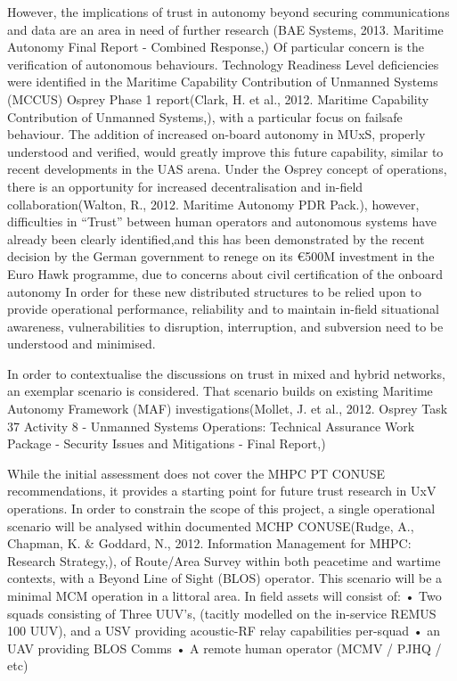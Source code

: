 However, the implications of trust in autonomy beyond securing communications and data are an area in need of further research (BAE Systems, 2013. Maritime Autonomy Final Report - Combined Response,)
Of particular concern is the verification of autonomous behaviours. Technology Readiness Level deficiencies were identified in the Maritime Capability Contribution of Unmanned Systems (MCCUS) Osprey Phase 1 report(Clark, H. et al., 2012. Maritime Capability Contribution of Unmanned Systems,), with a particular focus on failsafe behaviour. 
The addition of increased on-board autonomy in MUxS, properly understood and verified, would greatly improve this future capability, similar to recent developments in the UAS arena\cite{Cummings2010}.
Under the Osprey concept of operations, there is an opportunity for increased decentralisation and in-field collaboration(Walton, R., 2012. Maritime Autonomy PDR Pack.), however, difficulties in “Trust” between human operators and autonomous systems have already been clearly identified\cite{Chen2011b},and this has been demonstrated by the recent decision by the German government to renege on its €500M investment in the Euro Hawk programme, due to concerns about civil certification of the onboard autonomy\cite{Mehta2013}
In order for these new distributed structures to be relied upon to provide operational performance, reliability and to maintain in-field situational awareness, vulnerabilities to disruption, interruption, and subversion need to be understood and minimised.

In order to contextualise the discussions on trust in mixed and hybrid networks, an exemplar scenario is considered.
That scenario builds on existing Maritime Autonomy Framework (MAF) investigations(Mollet, J. et al., 2012. Osprey Task 37 Activity 8 - Unmanned Systems Operations: Technical Assurance Work Package - Security Issues and Mitigations - Final Report,)

While the initial assessment does not cover the MHPC PT CONUSE recommendations, it provides a starting point for future trust research in UxV operations.
In order to constrain the scope of this project, a single operational scenario will be analysed within documented MCHP CONUSE(Rudge, A., Chapman, K. \& Goddard, N., 2012. Information Management for MHPC: Research Strategy,), of Route/Area Survey within both peacetime and wartime contexts, with a Beyond Line of Sight (BLOS) operator.
This scenario will be a minimal MCM operation in a littoral area. In field assets will consist of:
•	Two squads consisting of Three UUV’s, (tacitly modelled on the in-service REMUS 100 UUV), and a USV providing acoustic-RF relay capabilities per-squad
•	an UAV providing BLOS Comms
•	A remote human operator (MCMV / PJHQ / etc)


